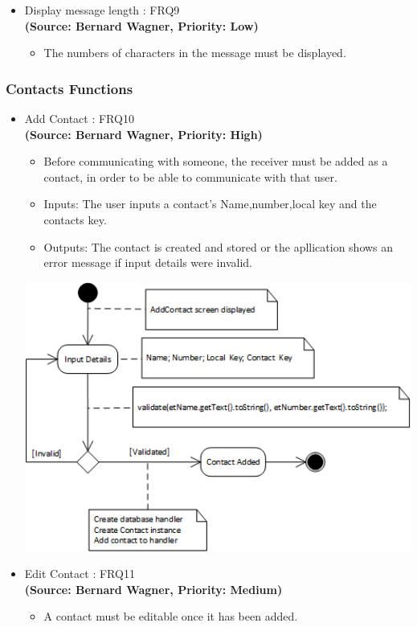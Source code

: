 \begin{itemize}
\item{Display message length : FRQ9}\\
\textbf{(Source: Bernard Wagner, Priority: Low)}
\begin{itemize}
\item The numbers of characters in the message must be displayed.
\end{itemize}
\end{itemize}
\subsubsection{Contacts Functions}
\begin{itemize}
\item{Add Contact : FRQ10}\\
\textbf{(Source: Bernard Wagner, Priority: High)}
\begin{itemize}
\item Before communicating with someone, the receiver must be added as a contact, in order to be able to communicate with that user.
\item Inputs: The user inputs a contact's Name,number,local key and the contacts key.
\item Outputs: The contact is created and stored or the apllication shows an error message if input details were invalid.
\end{itemize}
 \includegraphics[width=13cm]{diagrams/StateDiagrams/AddContactStateDiagram.png}
\item{Edit Contact : FRQ11}\\
\textbf{(Source: Bernard Wagner, Priority: Medium)}
\begin{itemize}
\item A contact must be editable once it has been added.

\end{itemize}
\end{itemize}
